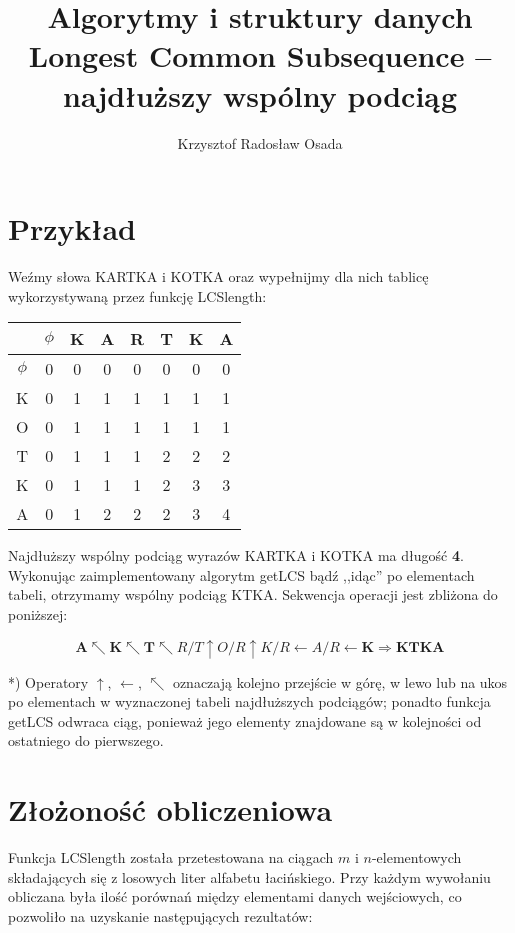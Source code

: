 \documentclass[a4paper,11pt]{article}
\author{Krzysztof Radosław Osada}
\title{\textbf{\Huge{Algorytmy i struktury danych}}\\[3pt] Longest Common Subsequence -- najdłuższy wspólny podciąg}
\newcommand*{\lineCode}{\fontfamily{cmtt}\selectfont}
\begin{document}
  \singlespacing
    \maketitle\thispagestyle{empty}
  \onehalfspacing
  \section{Przykład}
  Weźmy słowa KARTKA i KOTKA oraz wypełnijmy dla nich tablicę wykorzystywaną przez funkcję {\lineCode LCSlength}:
  \begin{table}[h]
  \centering
  \begin{tabular}{|c|c|c|c|c|c|c|c|}
    \hline
    & $\phi$ & K & A & R & T & K & A \\ \hline
    $\phi$ & 0 & 0 & 0 & 0 & 0 & 0 & 0 \\ \hline
    K & 0 & 1 & 1 & 1 & 1 & 1 & 1 \\ \hline
    O & 0 & 1 & 1 & 1 & 1 & 1 & 1 \\ \hline
    T & 0 & 1 & 1 & 1 & 2 & 2 & 2 \\ \hline
    K & 0 & 1 & 1 & 1 & 2 & 3 & 3  \\ \hline
    A & 0 & 1 & 2 & 2 & 2 & 3 & 4  \\ \hline

  \end{tabular}
  \end{table}

  Najdłuższy wspólny podciąg wyrazów KARTKA i KOTKA ma długość \textbf{4}. Wykonując zaimplementowany algorytm {\lineCode getLCS} bądź ,,idąc'' po elementach tabeli, otrzymamy wspólny podciąg KTKA. Sekwencja operacji jest zbliżona do poniższej:

  \begin{equation*}
    \boldsymbol{A} \nwarrow \boldsymbol{K} \nwarrow \boldsymbol{T} \nwarrow R/T \uparrow O/R \uparrow K/R \leftarrow A/R \leftarrow \boldsymbol{K} \Rightarrow \boldsymbol{KTKA}
  \end{equation*}

  *) Operatory $\uparrow$, $\leftarrow$, $\nwarrow$ oznaczają kolejno przejście w górę, w lewo lub na ukos po elementach w wyznaczonej tabeli najdłuższych podciągów; ponadto funkcja {\lineCode getLCS} odwraca ciąg, ponieważ jego elementy znajdowane są w kolejności od ostatniego do pierwszego.

  \section{Złożoność obliczeniowa}Funkcja {\lineCode LCSlength} została przetestowana na ciągach $m$ i $n$-elementowych składających się z losowych liter alfabetu łacińskiego. Przy każdym wywołaniu obliczana była ilość porównań między elementami danych wejściowych, co pozwoliło na uzyskanie następujących rezultatów:
\end{document}

